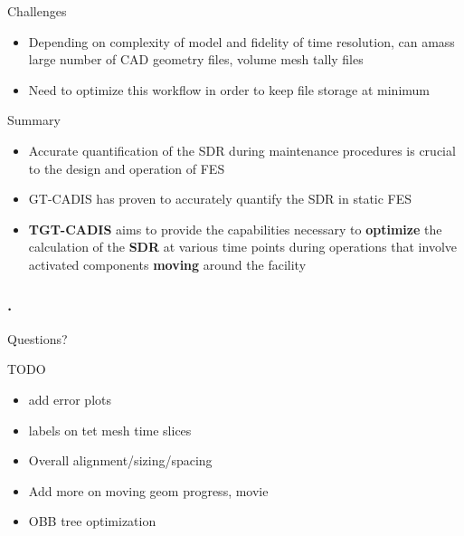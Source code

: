 \documentclass{beamer}
\begin{document}
\begin{frame}{Challenges}
			\begin{itemize}
				\item{Depending on complexity of model and
					fidelity of time resolution, can amass
					large number of CAD geometry files,
					volume mesh tally files}
				\item{Need to optimize this workflow in order
					to keep file storage at minimum}
			\end{itemize}
\end{frame}
\begin{frame}{Summary}
	\begin{itemize}
		\item{Accurate quantification of the SDR during maintenance
			procedures is crucial to the design and operation of
			FES}
		\item{GT-CADIS has proven to accurately quantify the SDR in
			static FES}
\vspace{0.5cm}
		\item{\textbf{TGT-CADIS} aims to provide the capabilities necessary to
			\textbf{optimize} the calculation of the \textbf{SDR} at various time points during
			operations that involve activated components \textbf{moving}
			around the facility}
	\end{itemize}
\end{frame}

\begin{frame}[c]
	\frametitle{\tiny{.}}
	\begin{center}
	{\Huge Questions?}
	\end{center}
\end{frame}

\begin{frame}{TODO}
	\begin{itemize}
		\item{add error plots}
		\item{labels on tet mesh time slices}
		\item{Overall alignment/sizing/spacing}
		\item{Add more on moving geom progress, movie}
		\item{OBB tree optimization}
	\end{itemize}
\end{frame}


\end{document}
